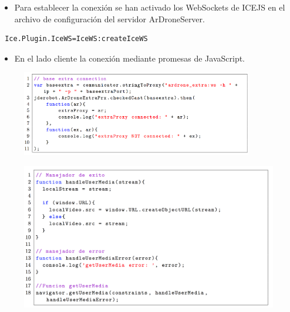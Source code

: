 \documentclass[notes,slidesec,a4]{seminar}
\begin{document}
\begin{hslide}
\begin{itemize}
\item Para establecer la conexión se han activado los WebSockets de ICEJS en el archivo de configuración del servidor ArDroneServer.
\end{itemize}
\lstset{}
\begin{lstlisting}
 Ice.Plugin.IceWS=IceWS:createIceWS
\end{lstlisting}
\begin{itemize}
\item En el lado cliente la conexión mediante promesas de JavaScript.
\end{itemize}

\begin{center}
\begin{figure}
\includegraphics[width=0.9\textwidth]{img/promiseconexionlocal}
\end{figure}
\end{center}
\end{hslide}


\begin{hslide}
\begin{center}
\begin{figure}
\includegraphics[width=1.1\textwidth]{img/getusermedia}
\end{figure}
\end{center}
\end{hslide}
\end{document}
